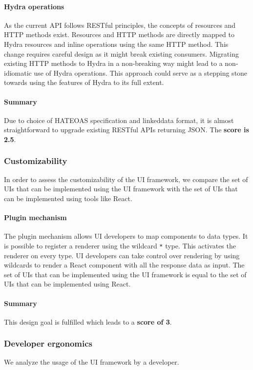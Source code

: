 \paragraph{Hydra operations}
As the current API follows RESTful principles, the concepts of resources and HTTP methods exist. Resources and HTTP methods are directly mapped to Hydra resources and inline operations using the same HTTP method. This change requires careful design as it might break existing consumers. Migrating existing HTTP methods to Hydra in a non-breaking way might lead to a non-idiomatic use of Hydra operations. This approach could serve as a stepping stone towards using the features of Hydra to its full extent.

\paragraph{Summary}
Due to choice of HATEOAS specification and \gls{linkeddata} format, it is almost straightforward to upgrade existing RESTful APIs returning JSON. The \textbf{score is 2.5}.

\subsubsection{Customizability}
In order to assess the customizability of the UI framework, we compare the set of UIs that can be implemented using the UI framework with the set of UIs that can be implemented using tools like React.

\paragraph{Plugin mechanism}
The plugin mechanism allows UI developers to map components to data types. It is possible to register a renderer using the wildcard \lstinline{*} type. This activates the renderer on every type. UI developers can take control over rendering by using wildcards to render a React component with all the response data as input. The set of UIs that can be implemented using the UI framework is equal to the set of UIs that can be implemented using React.

\paragraph{Summary}
This design goal is fulfilled which leads to a \textbf{score of 3}.

\subsubsection{Developer ergonomics}
We analyze the usage of the UI framework by a developer.

